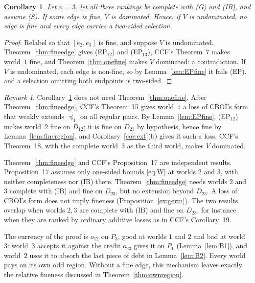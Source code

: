 \documentclass[11pt]{article}
\newtheorem{corollary}[theorem]{Corollary}
\theoremstyle{definition}\newtheorem{definition}[theorem]{Definition}
\theoremstyle{remark}\newtheorem{remark}[theorem]{Remark}
\begin{document}
\begin{corollary}\label{cor:fineedge}
Let $n=3$, let all three rankings be complete with (G) and (IB), and assume
(S). If some edge is fine, $V$ is dominated. Hence, if $V$ is undominated, no
edge is fine and every edge carries a two-sided selection.
\end{corollary}
\begin{proof}
Relabel so that $[e_2,e_3]$ is fine, and suppose $V$ is undominated.
Theorem~\ref{thm:fineedge} gives (EP$_{12}$) and (EP$_{13}$), CCF's
Theorem~7 makes world~$1$ fine, and Theorem~\ref{thm:onefine} makes $V$
dominated: a contradiction. If $V$ is undominated, each edge is non-fine, so
by Lemma~\ref{lem:EPfine} it fails (EP), and a selection omitting both
endpoints is two-sided.
\end{proof}

\begin{remark}\label{rem:edgeroute}
Corollary~\ref{cor:fineedge} does not need Theorem~\ref{thm:onefine}. After
Theorem~\ref{thm:fineedge}, CCF's Theorem~15 gives world~$1$ a loss of
CBOI's form that weakly extends $\preceq_1$ on all regular pairs. By
Lemma~\ref{lem:EPfine}, (EP$_{12}$) makes world~$2$ fine on $D_{12}$; it is
fine on $D_{23}$ by hypothesis, hence fine by Lemma~\ref{lem:fineregion}, and
Corollary~\ref{cor:ext}(b) gives it such a loss. CCF's Theorem~18, with the
complete world~$3$ as the third world, makes $V$ dominated.

Theorem~\ref{thm:fineedge} and CCF's Proposition~17 are independent results.
Proposition~17 assumes only one-sided bounds \eqref{eq:W} at worlds $2$ and
$3$, with neither completeness nor (IB) there. Theorem~\ref{thm:fineedge}
needs worlds $2$ and $3$ complete with (IB) and fine on $D_{23}$, but no
extension beyond $D_{23}$. A loss of CBOI's form does not imply fineness
(Proposition~\ref{ex:germ}). The two results overlap when worlds $2,3$ are
complete with (IB) and fine on $D_{23}$, for instance when they are ranked by
ordinary additive losses as in CCF's Corollary~19.
\end{remark}

The currency of the proof is $o_{12}$ on $P_3$, good at worlds $1$ and $2$
and bad at world~$3$: world~$3$ accepts it against the credit $o_{23}$ gives
it on $P_1$ (Lemma~\ref{lem:B1}), and world~$2$ uses it to absorb the last
piece of debt in Lemma~\ref{lem:B2}. Every world pays on its own odd region.
Without a fine edge, this mechanism leaves exactly the relative fineness
discussed in Theorem~\ref{thm:ownregion}.
\end{document}
